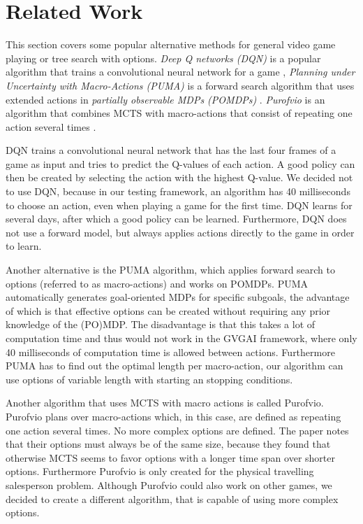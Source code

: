 \section{Related Work}
\label{sec:related}
This section covers some popular alternative methods for general video game
playing or tree search with options. \emph{Deep Q networks
(DQN)} is a popular algorithm that trains a convolutional neural network for a
game \cite{mnih2013playing}, \emph{Planning under Uncertainty with Macro-Actions
(PUMA)} is a forward search algorithm that uses extended actions in
\emph{partially observable MDPs (POMDPs)} \cite{he2010puma}.  \emph{Purofvio} is
an algorithm that combines MCTS with macro-actions that consist of repeating one
action several times \cite{powley2012monte}.

DQN trains a convolutional neural network that has the last four frames of a
game as input and tries to predict the Q-values of each action. A good policy
can then be created by selecting the action with the highest Q-value. We decided
not to use DQN, because in our testing framework, an algorithm has 40
milliseconds to choose an action, even when playing a game for the first time.
DQN learns for several days, after which a good policy can be learned.
Furthermore, DQN does not use a forward model, but always applies actions
directly to the game in order to learn.

Another alternative is the PUMA algorithm, which applies forward search to
options (referred to as macro-actions) and works on POMDPs. PUMA automatically
generates goal-oriented MDPs for specific subgoals, the advantage of which is
that effective options can be created without requiring any prior knowledge of
the (PO)MDP. The disadvantage is that this takes a lot of computation time and
thus would not work in the GVGAI framework, where only 40 milliseconds of
computation time is allowed between actions. Furthermore PUMA has to find out the
optimal length per macro-action, our algorithm can use options of variable
length with starting an stopping conditions.

Another algorithm that uses MCTS with macro actions is called Purofvio.
Purofvio plans over macro-actions which, in this case, are defined as repeating
one action several times. No more complex options are defined. The paper notes
that their options must always be of the same size, because they found that
otherwise MCTS seems to favor options with a longer time span over shorter
options. Furthermore Purofvio is only created for the physical travelling
salesperson problem. Although Purofvio could also work on other games, we
decided to create a different algorithm, that is capable of using more complex
options.
